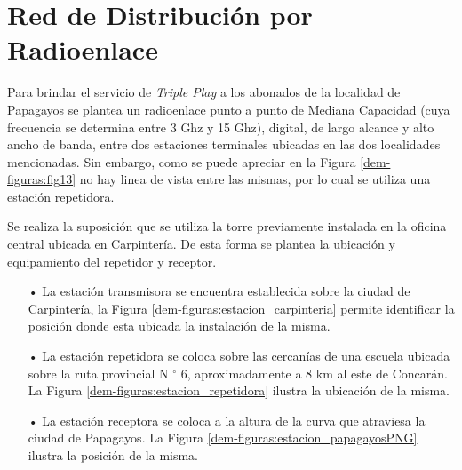 \section{Red de Distribución por Radioenlace}


Para brindar el servicio de \textit{Triple Play} a los abonados de la localidad de Papagayos se plantea un radioenlace punto a punto de Mediana Capacidad (cuya frecuencia se determina entre 3 Ghz y 15 Ghz), digital, de largo alcance y alto ancho de banda, entre dos estaciones terminales ubicadas en las dos localidades mencionadas. Sin embargo, como se puede apreciar en la Figura \ref{dem-figuras:fig13} no hay linea de vista entre las mismas, por lo cual se utiliza una estación repetidora.


Se realiza la suposición que se utiliza la torre previamente instalada en la oficina central ubicada en Carpintería. De esta forma se plantea la ubicación y equipamiento del repetidor y receptor.


\begin{enumerate}
\item[•]La estación transmisora se encuentra establecida sobre la ciudad de Carpintería, la Figura \ref{dem-figuras:estacion_carpinteria} permite identificar la posición donde esta ubicada la instalación de la misma.


\item[•]La estación repetidora se coloca sobre las cercanías de una escuela ubicada sobre la ruta provincial N $^{\circ}$ 6, aproximadamente a 8 km al este de Concarán. La Figura \ref{dem-figuras:estacion_repetidora} ilustra la ubicación de la misma.


\item[•]La estación receptora se coloca a la altura de la curva que atraviesa la ciudad de Papagayos. La Figura \ref{dem-figuras:estacion_papagayosPNG} ilustra la posición de la misma.

\end{enumerate}

